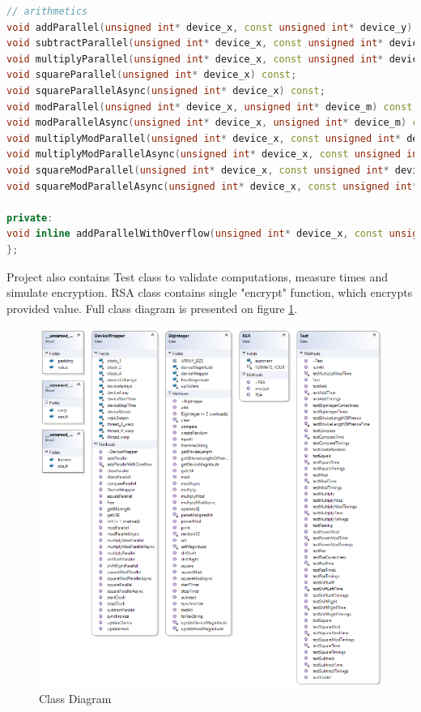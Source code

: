 \documentclass[oneside,openright,12pt,final,en]{mgr}
\begin{document}
\begin{lstlisting}[language=cpp,caption={DeviceWrapper.h}]
// arithmetics
void addParallel(unsigned int* device_x, const unsigned int* device_y) const;
void subtractParallel(unsigned int* device_x, const unsigned int* device_y) const;
void multiplyParallel(unsigned int* device_x, const unsigned int* device_y) const;
void squareParallel(unsigned int* device_x) const;
void squareParallelAsync(unsigned int* device_x) const;
void modParallel(unsigned int* device_x, unsigned int* device_m) const;
void modParallelAsync(unsigned int* device_x, unsigned int* device_m) const;
void multiplyModParallel(unsigned int* device_x, const unsigned int* device_y, const unsigned int* device_m) const;
void multiplyModParallelAsync(unsigned int* device_x, const unsigned int* device_y, const unsigned int* device_m) const;
void squareModParallel(unsigned int* device_x, const unsigned int* device_m) const;
void squareModParallelAsync(unsigned int* device_x, const unsigned int* device_m) const;

private:
void inline addParallelWithOverflow(unsigned int* device_x, const unsigned int* device_y, int blocks) const;
};
\end{lstlisting}

Project also contains Test class to validate computations, measure times and simulate encryption.
RSA class contains single "encrypt" function, which encrypts provided value. Full class diagram is presented on figure \ref{fig:classdiagram}.

\begin{figure}[H]
	\centering
	\includegraphics[width=\textwidth]{ClassDiagram}
	\caption{Class Diagram}
	\label{fig:classdiagram}
\end{figure}
\end{document}
